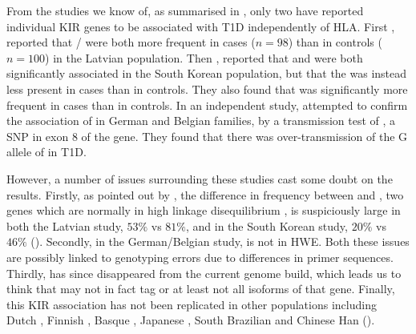 From the studies we know of, as summarised in ,
only two have reported individual KIR genes to be associated with T1D independently of \gls{HLA}.
First \citet{NikitinaZake:2004jv}, reported that / were both more frequent in cases ($n=98$) than in controls ($n=100$) in the Latvian population.
Then \citet{PARK:2006km},  reported that  and  were both significantly associated in the South Korean population,
but that the  was instead less present in cases than in controls.
They also found that  was significantly more frequent in cases than in controls.
In an independent study, \citet{RamosLopez:2009jf} attempted to confirm the association of  in German and Belgian families,
by a transmission test of , a \gls{SNP} in exon 8 of the  gene.
They found that there was over-transmission of the G allele of  in \gls{T1D}.

However, a number of issues surrounding these studies cast some doubt on the results.
Firstly, as pointed out by \citet{Middleton:2006ba}, the difference in frequency between  and ,
two genes which are normally in high linkage disequilibrium \citep{Single:2007br}, 
is suspiciously large in both the Latvian study, $53\%$ vs $81\%$, and in the South Korean study, $20\%$ vs $46\%$ ().
Secondly, in the \citet{RamosLopez:2009jf} German/Belgian study,  is not in \gls{HWE}.
Both these issues are possibly linked to genotyping errors due to differences in primer sequences.
Thirdly,  has since disappeared from the current genome build,
which leads us to think that  may not in fact tag  or at least not all isoforms of that gene.
Finally, this KIR association has not been replicated in other populations including
Dutch \citep{vanderSlik:2003gq},
Finnish \citep{Middleton:2006ba},
Basque \citep{Santin:2006hh},
Japanese \citep{Mogami:2007gj},
South Brazilian \citep{Jobim:2010}
and
Chinese Han \citep{Zhi:2011kl} ().

\clearpage

